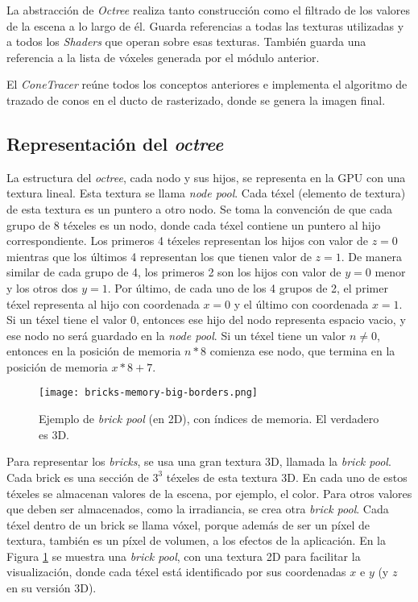La abstracción de \textit{Octree} realiza tanto construcción como el filtrado de los valores de la escena a lo largo de él.
Guarda referencias a todas las texturas utilizadas y a todos los \textit{Shaders} que operan sobre esas texturas.
También guarda una referencia a la lista de vóxeles generada por el módulo anterior.

El \textit{ConeTracer} reúne todos los conceptos anteriores e implementa el algoritmo de trazado de conos en el ducto de rasterizado, donde se genera la imagen final.

\subsection{Representación del \textit{octree}}

La estructura del \textit{octree}, cada nodo y sus hijos, se representa en la GPU con una textura lineal.
Esta textura se llama \textit{node pool}.
Cada téxel (elemento de textura) de esta textura es un puntero a otro nodo.
Se toma la convención de que cada grupo de 8 téxeles es un nodo, donde cada téxel contiene un puntero al hijo correspondiente.
Los primeros 4 téxeles representan los hijos con valor de $z = 0$ mientras que los últimos 4 representan los que tienen valor de $z = 1$.
De manera similar de cada grupo de 4, los primeros 2 son los hijos con valor de $y = 0$ menor y los otros dos $y = 1$.
Por último, de cada uno de los 4 grupos de 2, el primer téxel representa al hijo con coordenada $x = 0$ y el último con coordenada $x = 1$.
Si un téxel tiene el valor $0$, entonces ese hijo del nodo representa espacio vacio, y ese nodo no será guardado en la \textit{node pool}.
Si un téxel tiene un valor $n \not = 0$, entonces en la posición de memoria $n * 8$ comienza ese nodo, que termina en la posición de memoria $x * 8 + 7$.

\begin{figure}[h!]
    \centering
    \texttt{[image: bricks-memory-big-borders.png]}
    \caption{Ejemplo de \textit{brick pool} (en 2D), con índices de memoria. El verdadero es 3D.}
    \label{fig:brick_pool_example}
\end{figure}

Para representar los \textit{bricks}, se usa una gran textura 3D, llamada la \textit{brick pool}.
Cada brick es una sección de $3^3$ téxeles de esta textura 3D.
En cada uno de estos téxeles se almacenan valores de la escena, por ejemplo, el color.
Para otros valores que deben ser almacenados, como la irradiancia, se crea otra \textit{brick pool}.
Cada téxel dentro de un brick se llama vóxel, porque además de ser un píxel de textura, también es un píxel de volumen, a los efectos de la aplicación.
En la Figura \ref{fig:brick_pool_example} se muestra una \textit{brick pool}, con una textura 2D para facilitar la visualización, donde cada téxel está identificado por sus coordenadas $x$ e $y$ (y $z$ en su versión 3D).

